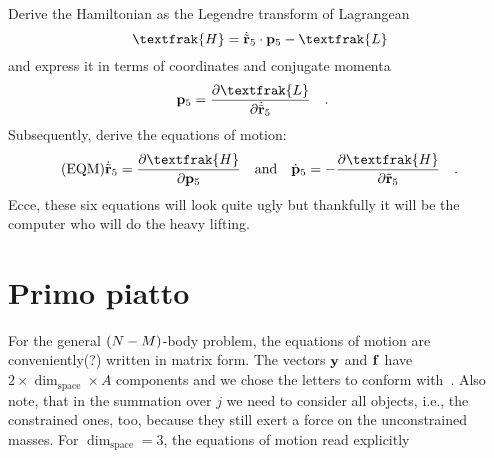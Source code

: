 \documentclass[]{article}
\begin{document}
\begin{bclogo}[logo={\bccrayon},arrondi=0.1]{}
Derive the Hamiltonian as the Legendre transform of Lagrangean 
$$
\textfrak{H} = \dot{\tilde{\vb{r}}}_5\cdot\vb{p}_5 - \textfrak{L}
$$
and express it in terms of
coordinates and conjugate momenta
$$
\vb{p}_5 = \frac{\partial \textfrak{L}}{\partial \dot{\tilde{\vb{r}}}_5}
\qq{.}
$$
Subsequently, derive the equations of motion:
\begin{align}\tag{EQM}
    \dot{\tilde{\vb{r}}}_5 &= \frac{\partial \textfrak{H}}{\partial \vb{p}_5}
    \qq{and}
    \dot{\vb{p}}_5 = -\frac{\partial \textfrak{H}}{\partial \tilde{\vb{r}}_5}
    \qq{.}
\end{align}
Ecce, these six equations will look quite ugly but thankfully it will be the computer
who will do the heavy lifting. 
\end{bclogo}

\newpage

\section*{\small Primo piatto}

For the general $\qty(N-M)$-body
problem, the equations of motion are conveniently(?) written in matrix form. The vectors $\vb{y}$ and $\vb{f}$
have $2\times\dim_{\text{space}}\times A$
components and we chose the letters to conform with~\cite{Schmid1990}.
Also note, that in the summation over $j$ we need to consider all objects, i.e., the constrained ones, too, because they
still exert a force on the unconstrained masses.
For $\dim_{\text{space}}=3$, the equations of motion read explicitly
\end{document}
